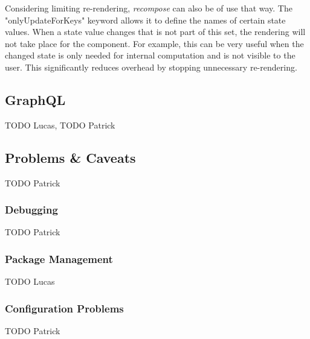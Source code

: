 \newline
Considering limiting re-rendering, \textit{recompose} can also be of use that way. The "onlyUpdateForKeys" keyword allows it to define the names of certain state values. When a state value changes that is not part of this set, the rendering will not take place for the component. For example, this can be very useful when the changed state is only needed for internal computation and is not visible to the user. This significantly reduces overhead by stopping unnecessary re-rendering.

\subsection{GraphQL}
\label{ssec:graphql}

TODO Lucas, TODO Patrick

\subsection{Problems \& Caveats}
\label{ssec:problems}

TODO Patrick

\subsubsection{Debugging}
\label{sssec:debugging}

TODO Patrick

\subsubsection{Package Management}
\label{sssec:package_management}

TODO Lucas

\subsubsection{Configuration Problems}
\label{sssec:configuration_problems}

TODO Patrick